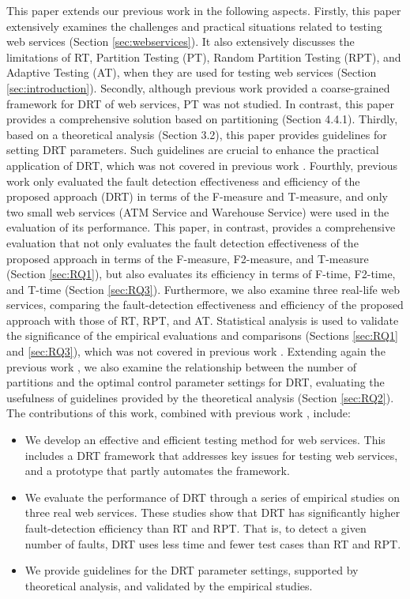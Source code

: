 \documentclass[10pt,journal,compsoc]{IEEEtran}
\begin{document}
This paper extends our previous work \cite{sun2012towards} in the following aspects. Firstly, this paper extensively examines the challenges and practical situations related to testing web services (Section \ref{sec:webservices}). It also extensively discusses the limitations of RT, Partition Testing (PT), Random Partition Testing (RPT), and Adaptive Testing (AT), when they are used for testing web services (Section \ref{sec:introduction}). Secondly, although previous work \cite{sun2012towards} provided a coarse-grained framework for DRT of web services, PT was not studied. In contrast, this paper provides a comprehensive solution based on partitioning (Section 4.4.1). Thirdly, based on a theoretical analysis (Section 3.2), this paper provides guidelines for setting DRT parameters. Such guidelines are crucial to enhance the practical application of DRT, which was not covered in previous work \cite{sun2012towards}. Fourthly, previous work \cite{sun2012towards} only evaluated the fault detection effectiveness and efficiency of the proposed approach (DRT) in terms of the F-measure and T-measure, and only two small web services (ATM Service and Warehouse Service) were used in the evaluation of its performance. This paper, in contrast, provides a comprehensive evaluation that not only evaluates the fault detection effectiveness of the proposed approach in terms of the F-measure, F2-measure, and T-measure (Section \ref{sec:RQ1}), but also evaluates its efficiency in terms of F-time, F2-time, and T-time (Section \ref{sec:RQ3}). Furthermore, we also examine three real-life web services, comparing the fault-detection effectiveness and efficiency of the proposed approach with those of RT, RPT, and AT. Statistical analysis is used to validate the significance of the empirical evaluations and comparisons (Sections \ref{sec:RQ1} and \ref{sec:RQ3}), which was not covered in previous work \cite{sun2012towards}. Extending again the previous work \cite{sun2012towards}, we also examine the relationship between the number of partitions and the optimal control parameter settings for DRT, evaluating the usefulness of guidelines provided by the theoretical analysis (Section \ref{sec:RQ2}). The contributions of this work, combined with previous work \cite{sun2012towards}, include:

\begin{itemize}
  \item
  We develop an effective and efficient testing method for web services.
  This includes a DRT framework that addresses key issues for testing web services, and a prototype that partly automates the framework.
  \item
  We evaluate the performance of DRT through a series of empirical studies on three real web services.
  These studies show that DRT has significantly higher fault-detection efficiency than RT and RPT. That is, to detect a given number of faults, DRT uses less time and fewer test cases than RT and RPT.
  \item
  We provide guidelines for the DRT parameter settings, supported by theoretical analysis, and validated by the empirical studies.
\end{itemize}
\end{document}
